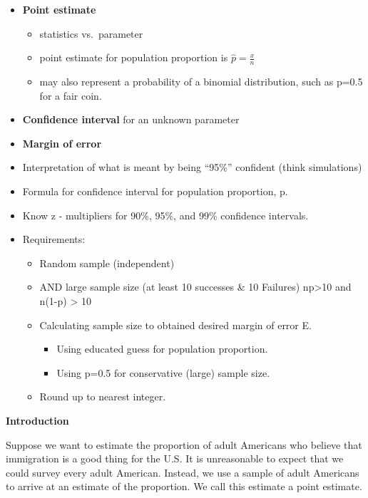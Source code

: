 \documentclass[
]{book}
\providecommand{\tightlist}{%
  \setlength{\itemsep}{0pt}\setlength{\parskip}{0pt}}
\begin{document}
\begin{itemize}
\item
  \textbf{Point estimate}

  \begin{itemize}
  \tightlist
  \item
    statistics vs.~parameter
  \item
    point estimate for population proportion is \(\hat{p}=\frac{x}{n}\)
  \item
    may also represent a probability of a binomial distribution, such as p=0.5 for a fair coin.
  \end{itemize}
\item
  \textbf{Confidence interval} for an unknown parameter
\item
  \textbf{Margin of error}
\item
  Interpretation of what is meant by being ``95\%'' confident (think simulations)
\item
  Formula for confidence interval for population proportion, p.
\item
  Know z - multipliers for 90\%, 95\%, and 99\% confidence intervals.
\item
  Requirements:

  \begin{itemize}
  \item
    Random sample (independent)
  \item
    AND large sample size (at least 10 successes \(\&\) 10 Failures) np\textgreater10 and n(1-p) \textgreater{} 10
  \item
    Calculating sample size to obtained desired margin of error E.

    \begin{itemize}
    \tightlist
    \item
      Using educated guess for population proportion.
    \item
      Using p=0.5 for conservative (large) sample size.
    \end{itemize}
  \item
    Round up to nearest integer.
  \end{itemize}
\end{itemize}

\textbf{Introduction}

Suppose we want to estimate the proportion of adult Americans who believe that immigration is a good thing for the U.S. It is unreasonable to expect that we could survey every adult American. Instead, we use a sample of adult Americans to arrive at an estimate of the proportion. We call this estimate a point estimate.
\end{document}
